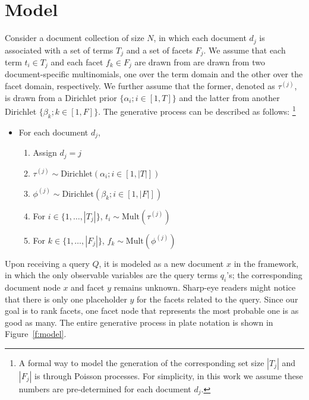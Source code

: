 \section{Model}\label{s:model}


Consider a document collection of size $N$, in which each document $d_j$ is
associated with a set of terms $T_j$ and a set of facets $F_j$.  We assume that
each term $t_i \in T_j$ and each facet $f_k \in F_j$ are drawn from are drawn
from two document-specific multinomials, one over the term domain and the other
over the facet domain, respectively.  We further assume that the former,
denoted as $\tau^{(j)}$, is drawn from a Dirichlet prior $\{ \alpha_i; i \in
[1, T] \}$ and the latter from another Dirichlet $\{ \beta_k; k \in [1, F] \}$.
The generative process can be described as follows: \footnote{A formal way to
model the generation of the corresponding set size $|T_j|$ and $|F_j|$ is
through Poisson processes.  For simplicity, in this work we assume these
numbers are pre-determined for each document $d_j$.} 

\begin{itemize} 
  \item For each document $d_j$, \begin{enumerate}
    \item Assign $d_j = j$
    \item $\tau^{(j)} \sim \textrm{Dirichlet}(\alpha_i; i \in [1, |T|])$
    \item $\phi^{(j)} \sim \textrm{Dirichlet}(\beta_k; i \in [1, |F|])$
    \item For $i \in \{ 1, \ldots, |T_j| \}$, $t_i \sim \textrm{Mult}(\tau^{(j)})$ 
    \item For $k \in \{ 1, \ldots, |F_j| \}$, $f_k \sim \textrm{Mult}(\phi^{(j)})$ 
  \end{enumerate}
\end{itemize}

Upon receiving a query $Q$, it is modeled as a new document $x$ in the
framework, in which the only observable variables are the query terms $q_i$'s;
the corresponding document node $x$ and facet $y$ remains unknown.  Sharp-eye
readers might notice that there is only one placeholder $y$ for the facets
related to the query.  Since our goal is to rank facets, one facet node that
represents the most probable one is as good as many.  The entire generative
process in plate notation is shown in Figure~\ref{f:model}.


